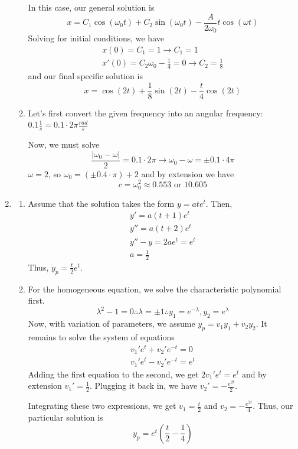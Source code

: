 \documentclass[12pt]{article}
\begin{document}
\begin{enumerate}
\begin{enumerate}
                    In this case, our general solution is
                    \[x=C_1\cos(\omega_0t)+C_2\sin(\omega_0t)-\frac{A}{2\omega_0}t\cos(\omega t)\]
                    Solving for initial conditions, we have
                    \begin{gather*}
                        x(0)=C_1=1 \rightarrow C_1=1 \\
                        x'(0)=C_2\omega_0-\frac{1}{4}=0 \rightarrow C_2=\frac{1}{8}
                    \end{gather*}
                    and our final specific solution is
                    \[x=\cos(2t)+\frac{1}{8}\sin(2t)-\frac{t}{4}\cos(2t)\]
              \item Let's first convert the given frequency into an angular frequency: $0.1 \frac{1}{s}=0.1 \cdot 2\pi \frac{rad}{s}$

                    Now, we must solve
                    \[\frac{|\omega_0-\omega|}{2}=0.1 \cdot 2\pi \rightarrow \omega_0-\omega=\pm 0.1 \cdot 4\pi\]
                    $\omega=2$, so $\omega_0=(\pm 0.4 \cdot \pi)+2$ and by extension we have
                    \[c=\omega_0^2\approx \boxed{0.553\text{ or }10.605}\]
          \end{enumerate}
    \item \begin{enumerate}
              \item Assume that the solution takes the form $y=ate^t$. Then,
                    \begin{gather*}
                        y'=a(t+1)e^t \\
                        y''=a(t+2)e^t \\
                        y''-y=2ae^t=e^t \\
                        a=\frac{1}{2}
                    \end{gather*}
                    Thus, $\boxed{y_p=\frac{t}{2}e^t}$.
              \item For the homogeneous equation, we solve the characteristic polynomial first.
                    \[\lambda^2-1=0 \therefore \lambda=\pm 1 \therefore y_1=e^{-\lambda}, y_2=e^\lambda\]
                    Now, with variation of parameters, we assume $y_p=v_1y_1 + v_2y_2$.
                    It remains to solve the system of equations
                    \begin{gather*}
                        v_1'e^t+v_2'e^{-t}=0 \\
                        v_1'e^t-v_2'e^{-t}=e^t
                    \end{gather*}
                    Adding the first equation to the second, we get $2v_1'e^t=e^t$ and by extension $v_1'=\frac{1}{2}$.
                    Plugging it back in, we have $v_2'=-\frac{e^{2t}}{2}$.

                    Integrating these two expressions, we get $v_1=\frac{t}{2}$ and $v_2=-\frac{e^{2t}}{4}$.
                    Thus, our particular solution is
                    \[y_p=e^t\left(\frac{t}{2}-\frac{1}{4}\right)\]
          \end{enumerate}
\end{enumerate}
\end{document}
